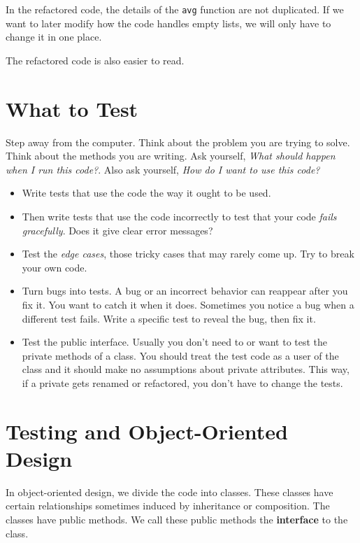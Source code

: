 In the refactored code, the details of the \texttt{avg} function are not duplicated.  If we want to later modify how the code handles empty lists, we will only have to change it in one place.  


The refactored code is also easier to read.  

\section{What to Test}


Step away from the computer.  Think about the problem you are trying to solve.  Think about the methods you are writing.  Ask yourself, \emph{What should happen when I run this code?}. Also ask yourself, \emph{How do I want to use this code?}

\begin{itemize}

\item Write tests that use the code the way it ought to be used.

\item Then write tests that use the code incorrectly to test that your code \emph{fails gracefully}.  Does it give clear error messages?

\item Test the \emph{edge cases}, those tricky cases that may rarely come up.  Try to break your own code.

\item Turn bugs into tests.  A bug or an incorrect behavior can reappear after you fix it.  You want to catch it when it does.  Sometimes you notice a bug when a different test fails.  Write a specific test to reveal the bug, then fix it.

\item Test the public interface.  Usually you don’t need to or want to test the private methods of a class.  You should treat the test code as a user of the class and it should make no assumptions about private attributes.  This way, if a private gets renamed or refactored, you don’t have to change the tests.

\end{itemize}
\section{Testing and Object-Oriented Design}


In object-oriented design, we divide the code into classes.  These classes have certain relationships sometimes induced by inheritance or composition.  The classes have public methods.  We call these public methods the \textbf{interface} to the class.


